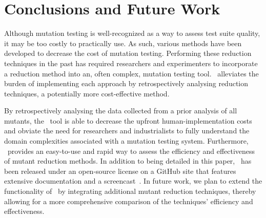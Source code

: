 
\section{Conclusions and Future Work}



Although mutation testing is well-recognized as a way to assess test suite quality, it may be too costly to practically
use. As such, various methods have been developed to decrease the cost of mutation testing. Performing these reduction
techniques in the past has required researchers and experimenters to incorporate a reduction method into an, often
complex, mutation testing tool. \mr~alleviates the burden of implementing each approach by retrospectively analysing
reduction techniques, a potentially more cost-effective method.


By retrospectively analysing the data collected from a prior analysis of all mutants, the \mr~tool is able to decrease
the upfront human-implementation costs and obviate the need for researchers and industrialists to fully understand the domain
complexities associated with a mutation testing system. Furthermore, \mr~provides an easy-to-use and rapid way to assess
the efficiency and effectiveness of mutant reduction methods. In addition to being detailed in this paper, \mr~has been
released under an open-source license on a GitHub site that features extensive documentation and a
screencast~\cite{tool}. In future work, we plan to extend the functionality of \mr~by integrating additional mutant
reduction techniques, thereby allowing for a more comprehensive comparison of the techniques' efficiency and
effectiveness.

